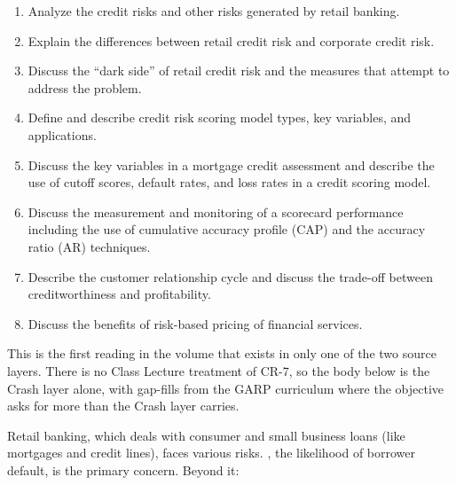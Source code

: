 
\begin{crkeybox}
\begin{enumerate}[label=\textbf{\alph*.},leftmargin=2em]
\item Analyze the credit risks and other risks generated by retail banking.
\item Explain the differences between retail credit risk and corporate credit risk.
\item Discuss the ``dark side'' of retail credit risk and the measures that attempt to address the problem.
\item Define and describe credit risk scoring model types, key variables, and applications.
\item Discuss the key variables in a mortgage credit assessment and describe the use of cutoff scores, default rates, and loss rates in a credit scoring model.
\item Discuss the measurement and monitoring of a scorecard performance including the use of cumulative accuracy profile (CAP) and the accuracy ratio (AR) techniques.
\item Describe the customer relationship cycle and discuss the trade-off between creditworthiness and profitability.
\item Discuss the benefits of risk-based pricing of financial services.
\end{enumerate}
\end{crkeybox}

\begin{crtrapbox}
This is the first reading in the volume that exists in only one of the two source
layers. There is no Class Lecture treatment of CR-7, so the body below is the
Crash layer alone, with gap-fills from the GARP curriculum where the objective
asks for more than the Crash layer carries.
\end{crtrapbox}


Retail banking, which deals with consumer and small business loans (like
mortgages and credit lines), faces various risks. , the
likelihood of borrower default, is the primary concern. Beyond it:

